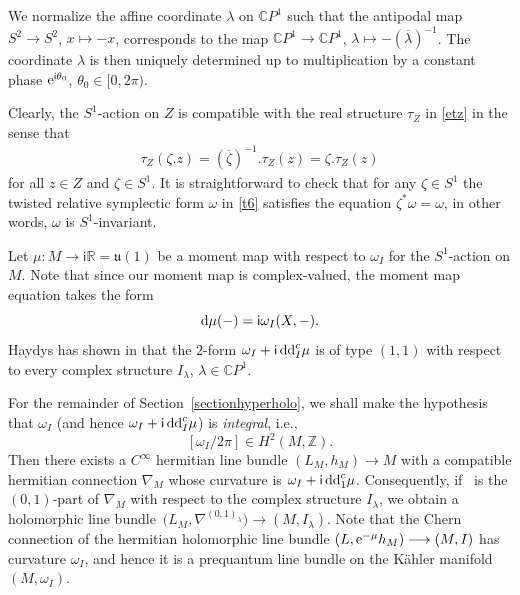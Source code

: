 \documentclass[pdftex]{sigma}
\numberwithin{equation}{section}
\theoremstyle{definition}
\newcommand\C{{\mathbb C}}
\newcommand{\R}{{\mathbb R}}
\renewcommand{\i}{\mathsf{i}}
\begin{document}
We normalize the affine coordinate $\lambda$ on $\C P^1$ such that the antipodal map $S^2 \longrightarrow S^2$,
$ x \longmapsto -x$, corresponds to the map $\C P^1 \longrightarrow \C P^1$, $ \lambda \longmapsto
-(\overline{\lambda})^{-1}$. The coordinate $\lambda$ is then uniquely determined up to multiplication by a constant
phase ${\rm e}^{\i \theta_0}$, $\theta_0 \in [0, 2\pi)$.

Clearly, the $S^1$-action on $Z$ is compatible with the real structure $\tau_Z$ in \eqref{etz} in the sense that
\begin{gather}\label{eq:S1tau}
\tau_Z(\zeta.z) = (\overline{\zeta})^{-1}.\tau_Z(z) = \zeta .\tau_Z(z)
\end{gather}
for all $z \in Z$ and $\zeta \in S^1$. It is straightforward to check that for any $\zeta \in S^1$ the
twisted relative
symplectic form $\omega$ in \eqref{t6} satisfies the equation
$%
\zeta^*\omega = \omega$,
in other words, $\omega$ is $S^1$-invariant.

Let $\mu \colon M \longrightarrow \i \R = \mathfrak{u}(1)$ be a moment map with respect to $\omega_I$
for the $S^1$-action on $M$. Note that since our moment map is complex-valued, the moment map equation takes the form
\begin{equation}\label{eq:MomentMapEq}
{\rm d}\mu(-) = \i \omega_I(X, -).
\end{equation}
Haydys has shown in \cite{Haydys} that the $2$-form $\omega_I + \i\, {\rm dd}_I^c \mu$ is of type $(1, 1)$ with respect to
every complex structure $I_\lambda$, $\lambda \in {\mathbb C}P^1$.

For the remainder of Section~\ref{sectionhyperholo}, we shall make the hypothesis that $\omega_I$ (and hence $\omega_I + \i \, {\rm dd}_I^c \mu$) is \emph{integral}, i.e.,
\begin{equation}\label{hyp:integral}
[\omega_I/2\pi] \in H^2(M, \mathbb{Z}).
\end{equation}
Then there exists a $C^\infty$ hermitian line bundle
$(L_M, h_M)
 \longrightarrow M$
with a compatible hermitian connection $\nabla_M$ whose curvature is $\omega_I + \i\, {\rm dd}_1^c \mu$.
Consequently, if~ is the $(0,1)$-part of $\nabla_M$ with respect to the complex structure
$I_\lambda$, we obtain a holomorphic line bundle~${\bigl(L_M, \nabla^{(0,1)_\lambda}\bigr) \longrightarrow (M,
I_\lambda)}$. Note that the Chern connection of the hermitian holomorphic line bundle $(L, {\rm e}^{-\mu}h_M)
 \longrightarrow (M, I)$ has curvature $\omega_I$, and hence it is a prequantum line bundle on the K\"ahler
manifold $(M, \omega_I)$.
\end{document}
